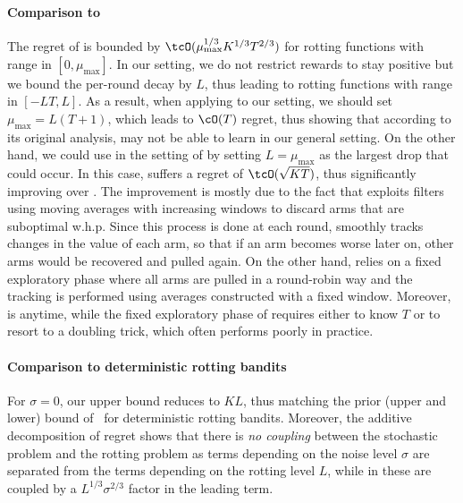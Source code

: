 \paragraph{Comparison to \citet{levine2017rotting}} The regret of \SWA is bounded by $\tcO(\mu_{\max}^{1/3}K^{1/3} T^{2/3})$ for rotting functions with range in $[0,\mu_{\max}]$. In our setting, we do not restrict rewards to stay positive but we bound the per-round decay by $L$, thus leading to rotting functions with range in $\left[-LT, L\right]$. As a result, when applying \SWA to our setting, we should set $\mu_{\max}=L(T+1)$, which leads to $\cO(T)$ regret, thus showing that according to its original analysis, \SWA may not be able to learn in our general setting. On the other hand, we could use \myAlgorithm in the setting of \citet{levine2017rotting} by setting $L = \mu_{\max}$ as the largest drop that could occur. In this case, \myAlgorithm suffers a regret of $\tcO(\sqrt{KT})$, thus significantly improving over \SWA. The improvement is mostly due to the fact that \myAlgorithm exploits filters using moving averages with increasing windows to discard arms that are suboptimal w.h.p. Since this process is done at each round, \myAlgorithm smoothly tracks changes in the value of each arm, so that if an arm becomes worse later on, other arms would be recovered and pulled again. On the other hand, \SWA relies on a fixed exploratory phase where all arms are pulled in a round-robin way and the tracking is performed using averages constructed with a fixed window. Moreover, \myAlgorithm is anytime, while the fixed exploratory phase of \SWA requires either to know $T$ or to resort to a doubling trick, which often performs poorly in practice. 
\paragraph{Comparison to deterministic rotting bandits}
For $\sigma=0$, our upper bound reduces to $KL$, thus matching the prior (upper and lower) bound of~\citet{heidari2016tight} for deterministic rotting bandits. Moreover, the additive decomposition of regret shows that there is \emph{no coupling} between the stochastic problem and the rotting problem as terms depending on the noise level $\sigma$ are separated from the terms depending on the rotting level $L$, while in \SWA these are coupled by a $L^{1/3}\sigma^{2/3}$ factor in the leading term. 
